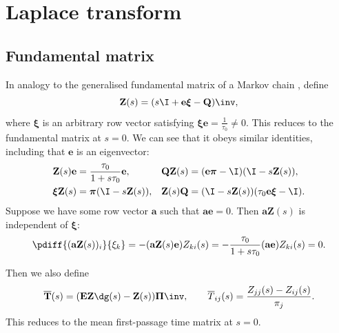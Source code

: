 \documentclass[12pt]{article}
\newcommand{\onev}{\mathbf{e}}
\newcommand{\onem}{\mathbf{E}}
\newcommand{\MMm}{Q}
\newcommand{\MM}{\mathbf{\MMm}}
\newcommand{\eqm}{\pi}
\newcommand{\eq}{\boldsymbol{\eqm}}
\newcommand{\Eqm}{\Pi}
\newcommand{\Eq}{\boldsymbol{\Eqm}}
\newcommand{\fptm}{T}
\newcommand{\fpt}{\mathbf{\fptm}}
\newcommand{\fptbm}{\overline{\fptm}}
\newcommand{\fptb}{\overline{\fpt}}
\newcommand{\fundm}{Z}
\newcommand{\fund}{\mathbf{\fundm}}
\newcommand{\arowm}{\xi}
\newcommand{\arow}{\boldsymbol{\arowm}}
\begin{document}

\section{Laplace transform}\label{sec:laplace}


\subsection{Fundamental matrix \etc}\label{sec:lfund}

In analogy to the generalised fundamental matrix of a Markov chain \cite{Kemeny1981fund}, define
%
\begin{equation}\label{eq:lfund}
  \fund(s) = (s \I + \onev \arow -\MM)\inv,
\end{equation}
%
where \(\arow\) is an arbitrary row vector satisfying \(\arow \onev = \frac{1}{\tau_0} \neq 0\).
This reduces to the fundamental matrix at \(s=0\).
We can see that it obeys similar identities, including that \(\onev\) is an eigenvector:
%
\begin{equation}\label{eq:lfundrowsum}
\begin{aligned}
  \fund(s) \onev &= \frac{\tau_0}{1+s\tau_0}\onev, \qquad &
  \MM \fund(s) &= (\onev \eq - \I)(\I - s \fund(s)), \\ 
  \arow \fund(s) &= \eq (\I - s \fund(s)),  &
  \fund(s) \MM &= (\I - s \fund(s))(\tau_0 \onev \arow - \I).
\end{aligned}
\end{equation}
%
Suppose we have some row vector \(\mathbf{a}\) such that \(\mathbf{a}\onev=0\).
Then \(\mathbf{a}\fund(s)\) is independent of \(\arow\):
%
\begin{equation}\label{eq:alfund}
  \pdiff{(\mathbf{a}\fund(s))_i}{\arowm_k} = -(\mathbf{a}\fund(s)\onev) \fundm_{ki}(s)
      = -\frac{\tau_0}{1+s\tau_0} (\mathbf{a}\onev) \fundm_{ki}(s) = 0.
\end{equation}
%

Then we also define
%
\begin{equation}\label{eq:lfptb}
  \fptb(s) = (\onem \fund\dg(s)-\fund(s))\Eq\inv,
  \qquad
  \fptbm_{ij}(s) = \frac{\fundm_{jj}(s)-\fundm_{ij}(s)}{\eqm_j}.
\end{equation}
%
This reduces to the mean first-passage time matrix at \(s=0\). 
\end{document}
